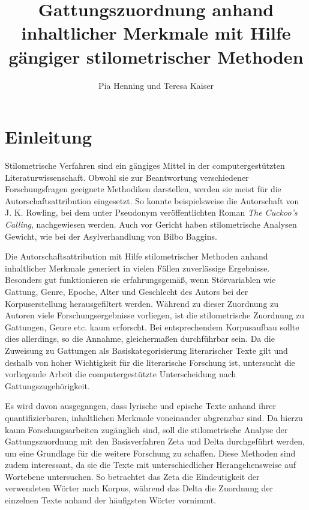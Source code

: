 \documentclass[a4paper,10p]{article}
\begin{document}
\title{Gattungszuordnung anhand inhaltlicher Merkmale mit Hilfe gängiger stilometrischer Methoden}
\author{Pia Henning und Teresa Kaiser}

\maketitle
\tableofcontents
\newpage
\listoffigures
\newpage
\section{Einleitung}
Stilometrische Verfahren sind ein gängiges Mittel in der computergestützten Literaturwissenschaft. Obwohl sie zur Beantwortung verschiedener Forschungsfragen geeignete Methodiken darstellen, werden sie meist für die Autorschaftsattribution eingesetzt. So konnte beispielsweise die Autorschaft von J. K. Rowling, bei dem unter Pseudonym veröffentlichten Roman \emph{The Cuckoo's Calling}, nachgewiesen werden. Auch vor Gericht haben stilometrische Analysen Gewicht, wie bei der Asylverhandlung von \glqq Bilbo Baggins\grqq \citep{Juola2015}.

Die Autorschaftsattribution mit Hilfe stilometrischer Methoden anhand inhaltlicher Merkmale generiert in vielen Fällen zuverlässige Ergebnisse. Besonders gut funktionieren sie erfahrungsgemäß, wenn Störvariablen wie Gattung, Genre, Epoche, Alter und Geschlecht des Autors bei der Korpuserstellung herausgefiltert werden. Während zu dieser Zuordnung zu Autoren viele Forschungsergebnisse vorliegen, ist die stilometrische Zuordnung zu Gattungen, Genre etc. kaum erforscht. Bei ent\-sprech\-en\-dem Korpusaufbau sollte dies allerdings, so die Annahme, gleichermaßen durchführbar sein. Da die Zuweisung zu Gattungen als Basiskategorisierung literarischer Texte gilt und deshalb von hoher Wichtigkeit für die literarische Forschung ist, untersucht die vorliegende Arbeit die computergestützte Unterscheidung nach Gattungszugehörigkeit. 

Es wird davon ausgegangen, dass lyrische und epische Texte anhand ihrer quantifizierbaren, inhaltlichen Merkmale voneinander abgrenzbar sind. Da hierzu kaum Forschungsarbeiten zugänglich sind, soll die stilometrische Analyse der Gattungszuordnung mit den Basisverfahren Zeta und Delta durchgeführt werden, um eine Grundlage für die weitere Forschung zu schaffen. Diese Methoden sind zudem interessant, da sie die Texte mit unterschiedlicher Herangehensweise auf Wortebene untersuchen. So betrachtet das Zeta die Eindeutigkeit der verwendeten Wörter nach Korpus, während das Delta die Zuordnung der einzelnen Texte anhand der häufigsten Wörter vornimmt. 
\end{document}
